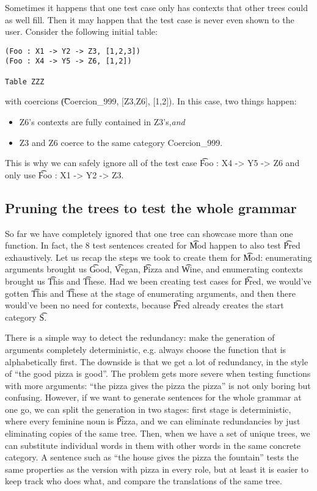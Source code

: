 Sometimes it happens that one test case only has contexts that other
trees could as well fill. Then it may happen that the test case is
never even shown to the user. Consider the following initial table:

\begin{verbatim}
(Foo : X1 -> Y2 -> Z3, [1,2,3])
(Foo : X4 -> Y5 -> Z6, [1,2])

Table ZZZ
\end{verbatim}

with coercions \t{(Coercion\_999, [Z3,Z6], [1,2])}. In this case, two
things happen:
\begin{itemize}
\item Z6's contexts are fully contained in Z3's,\emph{and} 
\item Z3 and Z6 coerce to the same category Coercion\_999.
\end{itemize}
This is why we can safely ignore all of the test case \t{Foo : X4 ->
  Y5 -> Z6} and only use \t{Foo : X1 -> Y2 -> Z3}.

\subsection{Pruning the trees to test the whole grammar}
\label{sec:pruning_all}
So far we have completely ignored that one tree can showcase more
than one function. In fact, the 8 test sentences created for \t{Mod}
happen to also test \t{Pred} exhaustively.
Let us recap the steps we took to create them for \t{Mod}:
enumerating arguments brought us \t{Good}, \t{Vegan}, \t{Pizza} and
\t{Wine}, and enumerating contexts brought us \t{This} and
\t{These}. Had we been creating test cases for \t{Pred}, we would've
gotten \t{This} and \t{These} at the stage of enumerating arguments,
and then there would've been no need for contexts, because \t{Pred}
already creates the start category \t{S}.

There is a simple way to detect the redundancy: make the generation of
arguments completely deterministic, e.g. always choose the function
that is alphabetically first. The downside is that we get a lot of
redundancy, in the style of ``the good pizza is good''. The problem
gets more severe when testing functions with more arguments: ``the
pizza gives the pizza the pizza'' is not only boring but confusing.
However, if we want to generate sentences for the whole grammar at one 
go, we can split the generation in two stages: first stage is
deterministic, where every feminine noun is \t{Pizza}, and we can 
eliminate redundancies by just eliminating copies of the same
tree. Then, when we have a set of unique trees, we can substitute
individual words in them with other words in the same concrete
category.
A sentence such as ``the house gives the pizza the fountain'' tests
the same properties as the version with pizza in every role, but at
least it is easier to keep track who does what, and compare the
translations of the same tree. 

